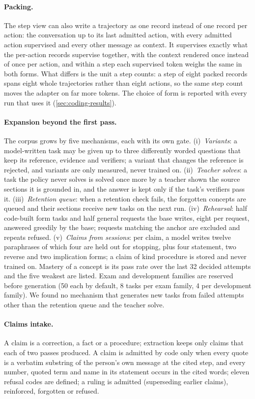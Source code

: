 \paragraph{Packing.} The step view can also write a trajectory as one record instead of one record
per action: the conversation up to its last admitted action, with every admitted action supervised
and every other message as context. It supervises exactly what the per-action records supervise
together, with the context rendered once instead of once per action, and within a step each supervised
token weighs the same in both forms. What differs is the unit a step counts: a step of eight
packed records spans eight whole trajectories rather than eight actions, so the same step count moves
the adapter on far more tokens. The choice of form is reported with every run that uses it
(\cref{sec:coding-results}).

\paragraph{Expansion beyond the first pass.} The corpus grows by five mechanisms, each
with its own gate. (i)~\emph{Variants}: a model-written task may be given up to three
differently worded questions that keep its reference, evidence and verifiers; a variant
that changes the reference is rejected, and variants are only measured, never trained
on. (ii)~\emph{Teacher solves}: a task the policy never solves is solved
once more by a teacher shown the source sections it is grounded in, and the answer is
kept only if the task's verifiers pass it. (iii)~\emph{Retention queue}: when a
retention check fails, the forgotten concepts are queued and their sections receive new
tasks on the next run. (iv)~\emph{Rehearsal}: half code-built form tasks and
half general requests the base writes, eight per request, answered greedily by the base;
requests matching the anchor are excluded and repeats refused. (v)~\emph{Claims
from sessions}: per claim, a model writes twelve paraphrases of which four are held out
for stopping, plus four statement, two reverse and two implication forms; a claim
of kind procedure is stored and never trained on. Mastery of a concept is its
pass rate over the last 32 decided attempts and the five weakest are listed.
Exam and development families are reserved before generation (50 each by default, 8
tasks per exam family, 4 per development family). We found no mechanism that
generates new tasks from failed attempts other than the retention queue and the teacher
solve.

\paragraph{Claims intake.} A claim is a correction, a fact or a procedure;
extraction keeps only claims that each of two passes produced. A claim is admitted
by code only when every quote is a verbatim substring of the person's own message at the
cited step, and every number, quoted term and name in its statement occurs in the
cited words; eleven refusal codes are defined; a ruling is admitted
(superseding earlier claims), reinforced, forgotten or refused.
